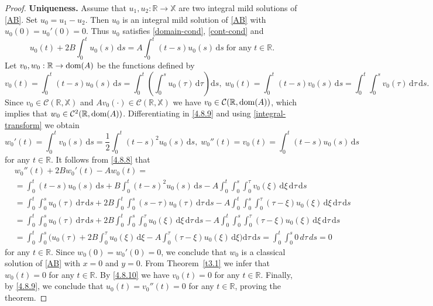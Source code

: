 \documentclass[11pt]{amsart}
\numberwithin{equation}{section}
\newcommand{\rmd}{{\mathrm{d}}}
\theoremstyle{remark}
\theoremstyle{definition}
\newcommand\bX{{\mathbb X}}
\newcommand{\dom}{\text{\rm{dom}}}
\begin{document}
\begin{proof}
	\noindent\textbf{Uniqueness.} Assume that $u_1, u_2 : \mathbb{R} \to\bX$ are two integral mild solutions of \eqref{AB}. Set $u_0 = u_1 - u_2$. Then $u_0$ is an integral mild solution of \eqref{AB} with $u_0(0)=u_0'(0)=0$. Thus $u_0$ satisfies \eqref{domain-cond}, \eqref{cont-cond} and
	\begin{equation}\label{4.8.8}
		u_0(t) + 2B\int_0^t u_0(s)\,\rmd s = A\int_0^t (t-s)u_0(s)\,\rmd s \; \text{for any}\; t \in \mathbb{R}.
	\end{equation}
	Let $v_0, w_0 : \mathbb{R} \to \dom(A)$ be the functions defined by
	\begin{equation}\label{4.8.9}
		v_0(t) = \int_0^t (t-s)u_0(s)\,\rmd s = \int_0^t\!\!\left(\int_0^s u_0(\tau)\,\rmd\tau\right)\rmd s,\;
		w_0(t) = \int_0^t (t-s)v_0(s)\,\rmd s = \int_0^t\!\!\int_0^s v_0(\tau)\,\rmd\tau\,\rmd s.
	\end{equation}
	Since $v_0 \in \mathcal{C}(\mathbb{R},\bX)$ and $Av_0(\cdot) \in \mathcal{C}(\mathbb{R},\bX)$ we have $v_0 \in \mathcal{C}(\mathbb{R},\dom(A))$, which implies that $w_0 \in \mathcal{C}^2(\mathbb{R},\dom(A))$.  Differentiating in \eqref{4.8.9} and using \eqref{integral-transform} we obtain
	\begin{equation}\label{4.8.10}
		w_0'(t) = \int_0^t v_0(s)\,\rmd s = \frac{1}{2}\int_0^t (t-s)^2 u_0(s)\,\rmd s,\;w_0''(t) = v_0(t) = \int_0^t (t-s)u_0(s)\,\rmd s
	\end{equation}
	for any $t \in \mathbb{R}$. 
It follows from \eqref{4.8.8} that
	\begin{align}\label{4.8.11}
		&w_0''(t) + 2Bw_0'(t) - Aw_0(t)=\nonumber\\
		&
		= \int_0^t (t-s)u_0(s)\,\rmd s + B\int_0^t (t-s)^2 u_0(s)\,\rmd s
		- A\int_0^t\!\!\int_0^s\!\!\int_0^\tau v_0(\xi)\,\rmd\xi\,\rmd\tau\,\rmd s\nonumber\\
		&= \int_0^t\!\!\int_0^s u_0(\tau)\,\rmd\tau\,\rmd s
		+ 2B\int_0^t\!\!\int_0^s (s-\tau)u_0(\tau)\,\rmd\tau\,\rmd s
		- A\int_0^t\!\!\int_0^s\!\!\int_0^\tau (\tau-\xi)u_0(\xi)\,\rmd\xi\,\rmd\tau\,\rmd s\nonumber\\
		&= \int_0^t\!\!\int_0^s u_0(\tau)\,\rmd\tau\,\rmd s
		+ 2B\int_0^t\!\!\int_0^s\!\!\int_0^\tau u_0(\xi)\,\rmd\xi\,\rmd\tau\,\rmd s
		- A\int_0^t\!\!\int_0^s\!\!\int_0^\tau (\tau-\xi)u_0(\xi)\,\rmd\xi\,\rmd\tau\,\rmd s\nonumber\\
		&
		= \int_0^t\!\!\int_0^s\!\Big(u_0(\tau) + 2B\int_0^\tau u_0(\xi)\,\rmd\xi
		- A\int_0^\tau (\tau-\xi)u_0(\xi)\,\rmd\xi\Big)\rmd\tau\,\rmd s
		= \int_0^t\!\!\int_0^s 0\,d\tau\,ds = 0 
	\end{align}
	for any $t \in \mathbb{R}$. Since $w_0(0) = w_0'(0) = 0$, we conclude that $w_0$ is a classical solution of \eqref{AB} with $x=0$ and $y=0$.
	From Theorem~\ref{t3.1} we infer that $w_0(t) = 0$ for any $t \in \mathbb{R}$. By \eqref{4.8.10} we have $v_0(t) = 0$ for any $t \in \mathbb{R}$. Finally, by \eqref{4.8.9}, we conclude that $u_0(t) = v_0''(t) = 0$ for any $t \in \mathbb{R}$, proving the theorem.
\end{proof}
\end{document}
